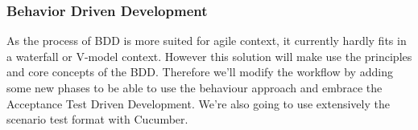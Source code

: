 \subsubsection{Behavior Driven Development}
As the process of BDD is more suited for agile context, it currently hardly
fits in a waterfall or V-model context.
However this solution will make use  the principles and core concepts of the
BDD\@.
Therefore we'll modify the workflow by adding some new phases to be able to
use the behaviour approach and embrace the Acceptance Test Driven Development.
We're also going to use extensively the scenario test format with Cucumber.